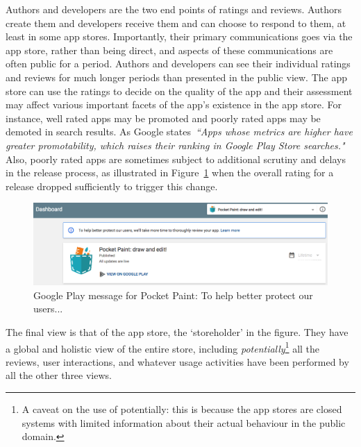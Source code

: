 Authors and developers are the two end points of ratings and reviews. Authors create them and developers receive them and can choose to respond to them, at least in some app stores. %
Importantly, their primary communications goes via the app store, rather than being direct, and aspects of these communications are often public for a period. Authors and developers can see their individual ratings and reviews for much longer periods than presented in the public view. The app store can use the ratings to decide on the quality of the app and their assessment may affect various important facets of the app's existence in the app store. For instance, well rated apps may be promoted and poorly rated apps may be demoted in search results. As Google states~\emph{``Apps whose metrics are higher have greater promotability, which raises their ranking in Google Play Store searches."}~\citep{android_vitals_best_practices} Also, poorly rated apps are sometimes subject to additional scrutiny and delays in the release process, as illustrated in Figure~\ref{fig:pocketpaint-to-help-better-protect-users} when the overall rating for a release dropped sufficiently to trigger this change. %

\begin{figure}
    \centering
    \includegraphics[width=15cm]{images/android-vitals-screenshots/pocketpaint-to-help-better-protect-users.png}
    \caption{Google Play message for Pocket Paint: To help better protect our users...}
    \label{fig:pocketpaint-to-help-better-protect-users}
\end{figure}

The final view is that of the app store, the `storeholder' in the figure. They have a global and holistic view of the entire store, including \textit{potentially}\footnote{A caveat on the use of potentially: this is because the app stores are closed systems with limited information about their actual behaviour in the public domain.} all the reviews, user interactions, and whatever usage activities have been performed by all the other three views. 


